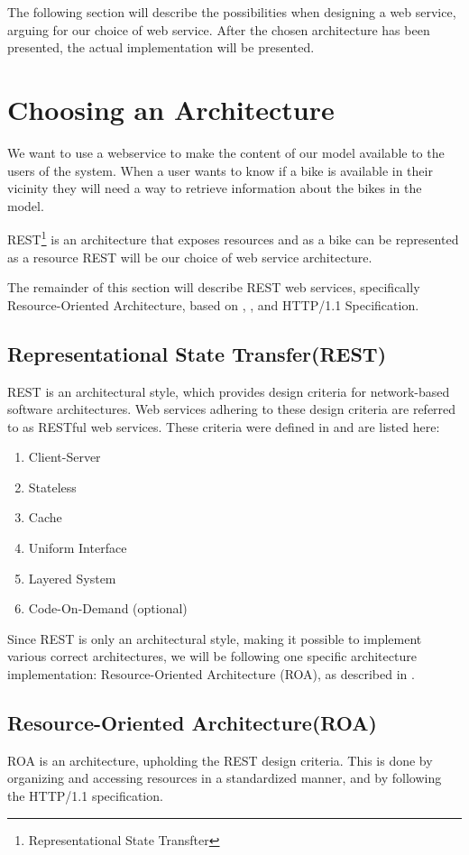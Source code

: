 The following section will describe the possibilities when designing a web service, arguing for our choice of web service.
After the chosen architecture has been presented, the actual implementation will be presented.

\section{Choosing an Architecture}
We want to use a webservice to make the content of our model available to the users of the system.
When a user wants to know if a bike is available in their vicinity they will need a way to retrieve information about the bikes in the model.

REST\footnote{Representational State Transfter} is an architecture that exposes resources and as a bike can be represented as a resource REST will be our choice of web service architecture.

The remainder of this section will describe REST web services, specifically Resource-Oriented Architecture, based on \citet{restful_web_services}, \citet{fielding_dissertation}, and HTTP/1.1 Specification\cite{http_specification}.


\subsection{Representational State Transfer(REST)}
REST is an architectural style, which provides design criteria for network-based software architectures.
Web services adhering to these design criteria are referred to as RESTful web services.
These criteria were defined in \citet[Chapter 5]{fielding_dissertation} and are listed here:
\begin{enumerate}
\item Client-Server
\item Stateless
\item Cache
\item Uniform Interface
\item Layered System
\item Code-On-Demand (optional)
\end{enumerate}

Since REST is only an architectural style, making it possible to implement various correct architectures, we will be following one specific architecture implementation: Resource-Oriented Architecture (ROA), as described in \citet{restful_web_services}.

\subsection{Resource-Oriented Architecture(ROA)}\label{webservice:roa}
ROA is an architecture, upholding the REST design criteria.
This is done by organizing and accessing resources in a standardized manner, and by following the HTTP/1.1 specification.

